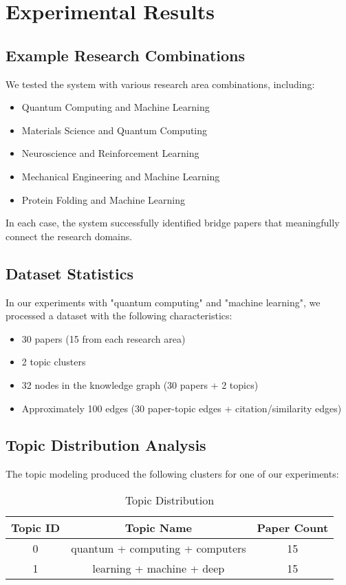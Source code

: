 \documentclass[11pt,a4paper]{article}
\begin{document}
\section{Experimental Results}

\subsection{Example Research Combinations}
We tested the system with various research area combinations, including:
\begin{itemize}
    \item Quantum Computing and Machine Learning
    \item Materials Science and Quantum Computing
    \item Neuroscience and Reinforcement Learning
    \item Mechanical Engineering and Machine Learning
    \item Protein Folding and Machine Learning
\end{itemize}

In each case, the system successfully identified bridge papers that meaningfully connect the research domains.

\subsection{Dataset Statistics}
In our experiments with "quantum computing" and "machine learning", we processed a dataset with the following characteristics:
\begin{itemize}
    \item 30 papers (15 from each research area)
    \item 2 topic clusters
    \item 32 nodes in the knowledge graph (30 papers + 2 topics)
    \item Approximately 100 edges (30 paper-topic edges + citation/similarity edges)
\end{itemize}

\subsection{Topic Distribution Analysis}
The topic modeling produced the following clusters for one of our experiments:
\begin{table}[h]
\centering
\begin{tabular}{ccc}
\toprule
\textbf{Topic ID} & \textbf{Topic Name} & \textbf{Paper Count} \\
\midrule
0 & quantum + computing + computers & 15 \\
1 & learning + machine + deep & 15 \\
\bottomrule
\end{tabular}
\caption{Topic Distribution}
\label{tab:topics}
\end{table}
\end{document}
